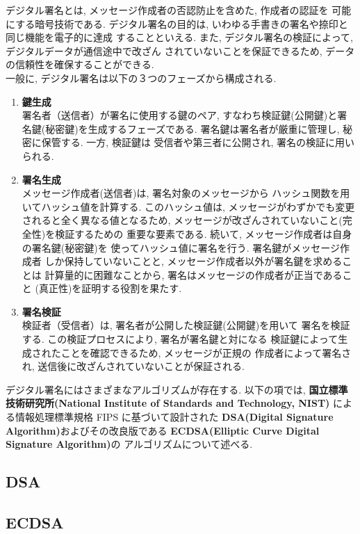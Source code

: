 デジタル署名とは, メッセージ作成者の否認防止を含めた, 作成者の認証を
可能にする暗号技術である. 
デジタル署名の目的は, いわゆる手書きの署名や捺印と同じ機能を電子的に達成
することといえる. また, デジタル署名の検証によって, デジタルデータが通信途中で改ざん
されていないことを保証できるため, データの信頼性を確保することができる.\\
\indent 一般に, デジタル署名は以下の３つのフェーズから構成される.

\begin{enumerate}
  \item \textbf{鍵生成}\\
  \indent 署名者（送信者）が署名に使用する鍵のペア, 
  すなわち検証鍵(公開鍵)と署名鍵(秘密鍵)を生成するフェーズである. 
  署名鍵は署名者が厳重に管理し, 秘密に保管する. 一方, 検証鍵は
  受信者や第三者に公開され, 署名の検証に用いられる.
  \item \textbf{署名生成}\\
  \indent メッセージ作成者(送信者)は, 署名対象のメッセージから
  ハッシュ関数を用いてハッシュ値を計算する. このハッシュ値は, 
  メッセージがわずかでも変更されると全く異なる値となるため, 
  メッセージが改ざんされていないこと(完全性)を検証するための
  重要な要素である. 続いて, メッセージ作成者は自身の署名鍵(秘密鍵)を
  使ってハッシュ値に署名を行う. 署名鍵がメッセージ作成者
  しか保持していないことと, メッセージ作成者以外が署名鍵を求めることは
  計算量的に困難なことから, 署名はメッセージの作成者が正当であること
  (真正性)を証明する役割を果たす. 
  \item \textbf{署名検証}\\
  \indent 検証者（受信者）は, 署名者が公開した検証鍵(公開鍵)を用いて
  署名を検証する. この検証プロセスにより, 署名が署名鍵と対になる
  検証鍵によって生成されたことを確認できるため, メッセージが正規の
  作成者によって署名され, 送信後に改ざんされていないことが保証される.
\end{enumerate}

デジタル署名にはさまざまなアルゴリズムが存在する. 以下の項では,  
\textbf{国立標準技術研究所(National Institute of Standards and Technology, NIST)}
による情報処理標準規格 FIPS に基づいて設計された
\textbf{DSA(Digital Signature Algorithm)}およびその改良版である
\textbf{ECDSA(Elliptic Curve Digital Signature Algorithm)}の
アルゴリズムについて述べる.\\

\subsection{DSA}

\subsection{ECDSA}
